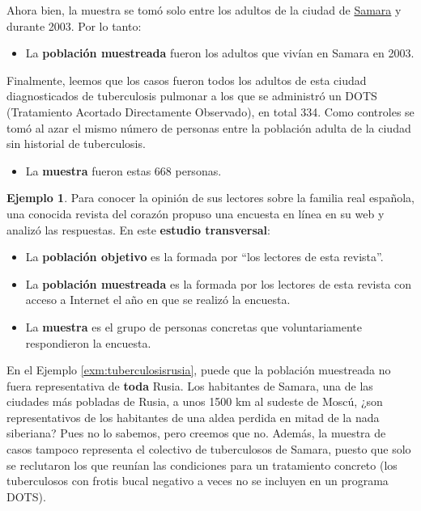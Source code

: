 \documentclass[
]{book}
\providecommand{\tightlist}{%
  \setlength{\itemsep}{0pt}\setlength{\parskip}{0pt}}
\theoremstyle{definition}
\theoremstyle{definition}
\newtheorem{example}{Ejemplo}[chapter]
\theoremstyle{definition}
\theoremstyle{definition}
\theoremstyle{remark}
\begin{document}
Ahora bien, la muestra se tomó solo entre los adultos de la ciudad de \href{https://es.wikipedia.org/wiki/Samara}{Samara} y durante 2003. Por lo tanto:

\begin{itemize}
\tightlist
\item
  La \textbf{población muestreada} fueron los adultos que vivían en Samara en 2003.
\end{itemize}

Finalmente, leemos que los casos fueron todos los adultos de esta ciudad diagnosticados de tuberculosis pulmonar a los que se administró un DOTS (Tratamiento Acortado Directamente Observado), en total 334. Como controles se tomó al azar el mismo número de personas entre la población adulta de la ciudad sin historial de tuberculosis.

\begin{itemize}
\tightlist
\item
  La \textbf{muestra} fueron estas 668 personas.
\end{itemize}

\begin{example}
\protect\hypertarget{exm:Hola}{}\label{exm:Hola}Para conocer la opinión de sus lectores sobre la familia real española, una conocida revista del corazón propuso una encuesta en línea en su web y analizó las respuestas. En este \textbf{estudio transversal}:
\end{example}

\begin{itemize}
\tightlist
\item
  La \textbf{población objetivo} es la formada por ``los lectores de esta revista''.
\item
  La \textbf{población muestreada} es la formada por los lectores de esta revista con acceso a Internet el año en que se realizó la encuesta.
\item
  La \textbf{muestra} es el grupo de personas concretas que voluntariamente respondieron la encuesta.
\end{itemize}

En el Ejemplo \ref{exm:tuberculosisrusia}, puede que la población muestreada no fuera representativa de \textbf{toda} Rusia. Los habitantes de Samara, una de las ciudades más pobladas de Rusia, a unos 1500 km al sudeste de Moscú, ¿son representativos de los habitantes de una aldea perdida en mitad de la nada siberiana? Pues no lo sabemos, pero creemos que no. Además, la muestra de casos tampoco representa el colectivo de tuberculosos de Samara, puesto que solo se reclutaron los que reunían las condiciones para un tratamiento concreto (los tuberculosos con frotis bucal negativo a veces no se incluyen en un programa DOTS).
\end{document}

